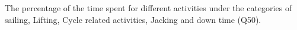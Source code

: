 The percentage of the time spent for different activities under the categories of sailing, Lifting, Cycle related activities, Jacking and down time (Q50).